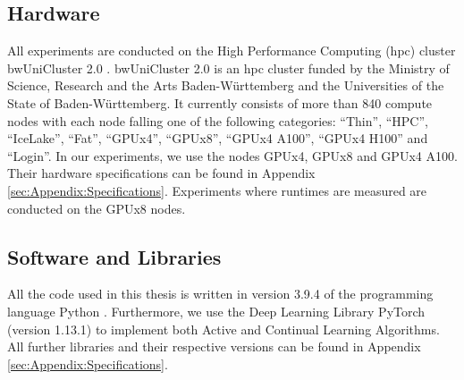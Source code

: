 \subsection{Hardware}
\label{sec:ExperimentSetup:Hardware}
All experiments are conducted on the High Performance Computing (\gls{hpc}) cluster bwUniCluster 2.0 \cite{bwUnicluster}. bwUniCluster 2.0 is an \gls{hpc} cluster
funded by the Ministry of Science, Research and the Arts Baden-Württemberg and the Universities of the State of Baden-Württemberg. It currently consists
of more than 840 compute nodes with each node falling one of the following categories: \enquote{Thin}, \enquote{HPC}, \enquote{IceLake}, \enquote{Fat},
\enquote{GPUx4}, \enquote{GPUx8}, \enquote{GPUx4 A100}, \enquote{GPUx4 H100} and \enquote{Login}. In our experiments, we use the nodes GPUx4, GPUx8 and
GPUx4 A100. Their hardware specifications can be found in Appendix \ref{sec:Appendix:Specifications}. Experiments where runtimes are measured are
conducted on the GPUx8 nodes.

\subsection{Software and Libraries}
\label{sec:ExperimentSetup:Software}
All the code used in this thesis is written in version 3.9.4 of the programming language Python \cite{Rossum1995Python}. Furthermore, we use the Deep
Learning Library PyTorch \cite{paszke2019pytorch} (version 1.13.1) to implement both Active and Continual Learning Algorithms. All further libraries
and their respective versions can be found in Appendix \ref{sec:Appendix:Specifications}.

